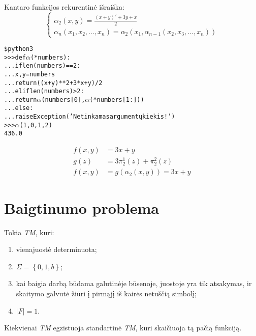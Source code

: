 Kantaro funkcijos rekurentinė išraiška:
\[
\begin{cases}
   \alpha _{2} (x,y) = \frac{(x+y)^{2} + 3y + x}{2} \\
   \alpha _{n} (x_1,x_2,\dotsc,x_n) =%
   \alpha _{2} (x_1, \alpha _{n-1} (x_2,x_3,\dotsc,x_n))
\end{cases}
\]

\begin{note}
  \begin{alltt}
\$ python3
>>> def \(\alpha\)(*numbers):
...   if len(numbers) == 2:
...     x, y = numbers
...     return ((x+y)**2 + 3*x + y)/2
...   elif len(numbers) > 2:
...     return \(\alpha\)(numbers[0], \(\alpha\)(*numbers[1:]))
...   else:
...     raise Exception('Netinkamas argumentų kiekis!')
>>> \(\alpha\)(1,0,1,2)
436.0
  \end{alltt}
\end{note}

\begin{exmp}
  \begin{align*}
    f(x,y) &= 3x + y \\
    g(z) &= 3 \pi^{1}_{2}(z) + \pi^{2}_{2}(z) \\
    f(x,y) &= g(\alpha_{2}(x,y)) = 3x + y
  \end{align*}
\end{exmp}

\section{Baigtinumo problema}

\begin{defn}
  Tokia \emph{TM}, kuri:
  \begin{enumerate}
    \item vienajuostė determinuota;
    \item $\Sigma = \left\{ 0, 1, b \right\}$;
    \item kai baigia darbą būdama galutinėje būsenoje, juostoje yra tik
      atsakymas, ir skaitymo galvutė žiūri į pirmąjį iš kairės netuščią
      simbolį;
    \item $|F| = 1$.
  \end{enumerate}
\end{defn}

\begin{prop}
  Kiekvienai \emph{TM} egzistuoja standartinė \emph{TM}, kuri skaičiuoja
  tą pačią funkciją.
\end{prop}

